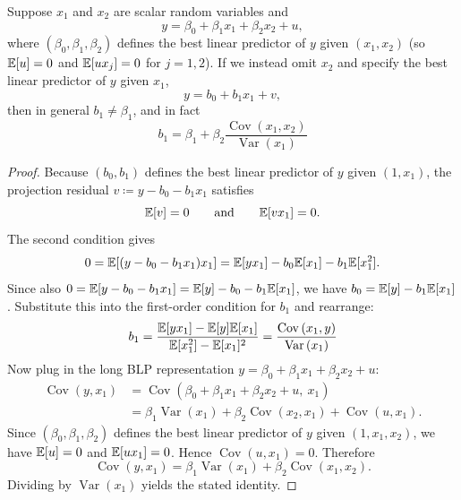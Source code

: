 \begin{proposition}
	Suppose $x_1$ and $x_2$ are scalar random variables and
	\[
		y = \beta_0 + \beta_1 x_1 + \beta_2 x_2 + u,
	\]
	where $(\beta_0,\beta_1,\beta_2)$ defines the best linear predictor of $y$ given $(x_1,x_2)$ (so $\mathbb{E}[u]=0$ and $\mathbb{E}[u x_j]=0$ for $j=1,2$).
	If we instead omit $x_2$ and specify the best linear predictor of $y$ given $x_1$,
	\[
		y = b_0 + b_1 x_1 + v,
	\]
	then in general $b_1\ne \beta_1$, and in fact
	\[
		b_1
		= \beta_1 + \beta_2 \frac{\operatorname{Cov}\left(x_1,x_2\right)}{\operatorname{Var}\left(x_1\right)}
	\]
\end{proposition}
\begin{proof}
	Because $(b_0,b_1)$ defines the best linear predictor of $y$ given $(1,x_1)$, the projection residual $v\coloneqq y-b_0-b_1x_1$ satisfies
	\[
		\mathbb{E}[v]=0
		\qquad \text{and} \qquad
		\mathbb{E}[v x_1]=0.
	\]
	The second condition gives
	\[
		0=\mathbb{E}[(y-b_0-b_1x_1)x_1]
		=\mathbb{E}[yx_1]-b_0\mathbb{E}[x_1]-b_1\mathbb{E}[x_1^2].
	\]
	Since also $0=\mathbb{E}[y-b_0-b_1x_1]=\mathbb{E}[y]-b_0-b_1\mathbb{E}[x_1]$, we have $b_0=\mathbb{E}[y]-b_1\mathbb{E}[x_1]$.
	Substitute this into the first-order condition for $b_1$ and rearrange:
	\[
		b_1=\frac{\mathbb{E}[yx_1]-\mathbb{E}[y]\mathbb{E}[x_1]}{\mathbb{E}[x_1^2]-\mathbb{E}[x_1]^2}
		= \frac{\operatorname{Cov}\left(x_1,y\right)}{\operatorname{Var}\left(x_1\right)}
	\]
	Now plug in the long BLP representation $y=\beta_0+\beta_1x_1+\beta_2x_2+u$:
	\begin{align*}
		\operatorname{Cov}\left(y,x_1\right)
		&= \operatorname{Cov}(\beta_0+\beta_1x_1+\beta_2x_2+u,\ x_1) \\
		&= \beta_1\operatorname{Var}\left(x_1\right) + \beta_2\operatorname{Cov}\left(x_2,x_1\right) + \operatorname{Cov}\left(u,x_1\right).
	\end{align*}
	Since $(\beta_0,\beta_1,\beta_2)$ defines the best linear predictor of $y$ given $(1,x_1,x_2)$, we have $\mathbb{E}[u]=0$ and $\mathbb{E}[ux_1]=0$.
	Hence $\operatorname{Cov}\left(u,x_1\right)=0$.
	Therefore
	\[
		\operatorname{Cov}\left(y,x_1\right) = \beta_1 \operatorname{Var}\left(x_1\right) + \beta_2 \operatorname{Cov}\left(x_1,x_2\right)
	.\]
	Dividing by $\operatorname{Var}(x_1)$ yields the stated identity.
	\end{proof}


